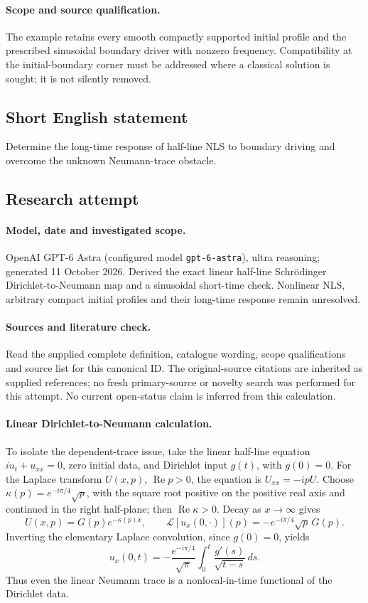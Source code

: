 \documentclass[11pt]{article}
\begin{document}
\paragraph{Scope and source qualification.}The example retains every smooth compactly supported initial profile and the prescribed sinusoidal boundary driver with nonzero frequency. Compatibility at the initial-boundary corner must be addressed where a classical solution is sought; it is not silently removed.
\subsection{Short English statement}
Determine the long-time response of half-line NLS to boundary driving and overcome the unknown Neumann-trace obstacle.
\subsection{Research attempt}
\paragraph{Model, date and investigated scope.}
OpenAI GPT-6 Astra (configured model \texttt{gpt-6-astra}), ultra reasoning; generated 11 October 2026. Derived the exact linear half-line Schrödinger Dirichlet-to-Neumann map and a sinusoidal short-time check. Nonlinear NLS, arbitrary compact initial profiles and their long-time response remain unresolved.

\paragraph{Sources and literature check.}
Read the supplied complete definition, catalogue wording, scope qualifications and source list for this canonical ID. The original-source citations are inherited as supplied references; no fresh primary-source or novelty search was performed for this attempt. No current open-status claim is inferred from this calculation.

\paragraph{Linear Dirichlet-to-Neumann calculation.}To isolate the dependent-trace issue, take the linear half-line equation \(iu_t+u_{xx}=0\), zero initial data, and Dirichlet input \(g(t)\), with \(g(0)=0\). For the Laplace transform \(U(x,p)\), \(\operatorname{Re}p>0\), the equation is \(U_{xx}=-ipU\). Choose \(\kappa(p)=e^{-i\pi/4}\sqrt p\), with the square root positive on the positive real axis and continued in the right half-plane; then \(\operatorname{Re}\kappa>0\). Decay as \(x\to\infty\) gives
\[U(x,p)=G(p)e^{-\kappa(p)x},\qquad
\mathcal L[u_x(0,\cdot)](p)=-e^{-i\pi/4}\sqrt p\,G(p).
\]
Inverting the elementary Laplace convolution, since \(g(0)=0\), yields
\[u_x(0,t)=-\frac{e^{-i\pi/4}}{\sqrt\pi}\int_0^t\frac{g'(s)}{\sqrt{t-s}}\,ds.
\]
Thus even the linear Neumann trace is a nonlocal-in-time functional of the Dirichlet data.
\end{document}
